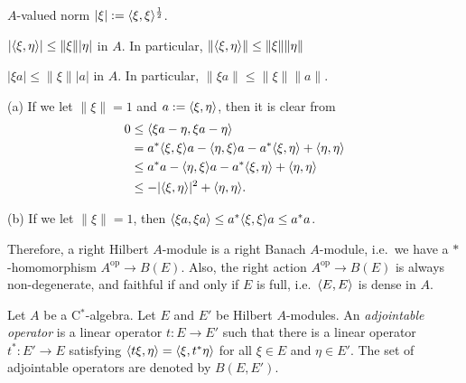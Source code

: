 \documentclass{../../../small}
\begin{document}
\begin{prop}
$A$-valued norm $|\xi|:=\langle\xi,\xi\rangle^{\frac12}$.
\begin{parts}
\item $|\langle\xi,\eta\rangle|\le\|\xi\||\eta|$ in $A$. In particular, $\|\langle\xi,\eta\rangle\|\le\|\xi\|\|\eta\|$
\item $|\xi a|\le\|\xi\||a|$ in $A$. In particular, $\|\xi a\|\le\|\xi\|\|a\|$.
\end{parts}
\end{prop}
\begin{pf}
(a)
If we let $\|\xi\|=1$ and $a:=\langle\xi,\eta\rangle$, then it is clear from
\begin{align*}
0&\le\langle\xi a-\eta,\xi a-\eta\rangle\\
&=a^*\langle\xi,\xi\rangle a-\langle\eta,\xi\rangle a-a^*\langle\xi,\eta\rangle+\langle\eta,\eta\rangle\\
&\le a^*a-\langle\eta,\xi\rangle a-a^*\langle\xi,\eta\rangle+\langle\eta,\eta\rangle\\
&\le-|\langle\xi,\eta\rangle|^2+\langle\eta,\eta\rangle.
\end{align*}

(b)
If we let $\|\xi\|=1$, then $\langle\xi a,\xi a\rangle\le a^*\langle\xi,\xi\rangle a\le a^*a$.
\end{pf}

Therefore, a right Hilbert $A$-module is a right Banach $A$-module, i.e.~we have a $*$-homomorphism $A^{\mathrm{op}}\to B(E)$.
Also, the right action $A^{\mathrm{op}}\to B(E)$ is always non-degenerate, and faithful if and only if $E$ is full, i.e.~$\langle E,E\rangle$ is dense in $A$.


\begin{defn}
Let $A$ be a C$^*$-algebra.
Let $E$ and $E'$ be Hilbert $A$-modules.
An \emph{adjointable operator} is a linear operator $t:E\to E'$ such that there is a linear operator $t^*:E'\to E$ satisfying $\langle t\xi,\eta\rangle=\langle\xi,t^*\eta\rangle$ for all $\xi\in E$ and $\eta\in E'$.
The set of adjointable operators are denoted by $B(E,E')$.
\end{defn}
\end{document}
